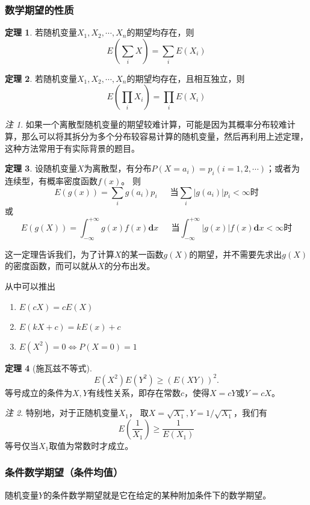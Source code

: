 \documentclass[a4paper,11pt]{article}%
\theoremstyle{remark}
\newtheorem*{remark}{注}
\theoremstyle{remark}
\theoremstyle{definition}
\newtheorem{theorem}{定理}[section]
\theoremstyle{definition}
\theoremstyle{plain}
\newcommand*{\abs}[1]{\lvert #1 \rvert}
\begin{document}
\subsubsection{数学期望的性质}
\begin{theorem}
    若随机变量$X_1,X_2,\cdots,X_n$的期望均存在，则
    \[E(\sum_i X)=\sum_i E(X_i)\]
\end{theorem}
\begin{theorem}
    若随机变量$X_1,X_2,\cdots,X_n$的期望均存在，且相互独立，则
    \[E(\prod_iX_i)=\prod_iE(X_i)\]
\end{theorem}
\begin{remark}
    如果一个离散型随机变量的期望较难计算，可能是因为其概率分布较难计算，那么可以将其拆分为多个分布较容易计算的随机变量，然后再利用上述定理，这种方法常用于有实际背景的题目。
\end{remark}
\begin{theorem}
    设随机变量$X$为离散型，有分布$P(X=a_i)=p_i(i=1,2,\cdots)$；或者为连续型，有概率密度函数$f(x)$。
    则
    \[E(g(x))=\sum_ig(a_i)p_i\phantom{222}\text{当}\sum_i\abs{g(a_i)}p_i<\infty\text{时}\]
    或
    \[E(g(X))=\int_{-\infty}^{+\infty}g(x)f(x)\mathbf{d}x\phantom{111}\text{当}\int_{-\infty}^{+\infty}\abs{g(x)}f(x)\mathbf{d}x<\infty\text{时}\]
\end{theorem}
这一定理告诉我们，为了计算$X$的某一函数$g(X)$的期望，并不需要先求出$g(X)$的密度函数，而可以就从$X$的分布出发。

从中可以推出
\begin{enumerate}
    \item$E(cX)=cE(X)$
    \item$E(kX+c)=kE(x)+c$
    \item$E(X^2)=0\Leftrightarrow P(X=0)=1$
\end{enumerate}
\begin{theorem}[施瓦兹不等式]
   \[E(X^2)E(Y^2)\geq (E(XY))^2.\]
   等号成立的条件为$X,Y$有线性关系，即存在常数$c$，使得$X=cY$或$Y=cX$。
\end{theorem}
\begin{remark}
    特别地，对于正随机变量$X_1$， 取$X=\sqrt{X_1},Y=1/\sqrt{X_1}$，我们有
    \[E(\frac{1}{X_1})\geq \frac{1}{E(X_1)}\]
    等号仅当$X_1$取值为常数时才成立。
\end{remark}
\subsubsection{条件数学期望（条件均值）}
随机变量$Y$的条件数学期望就是它在给定的某种附加条件下的数学期望。
\end{document}
